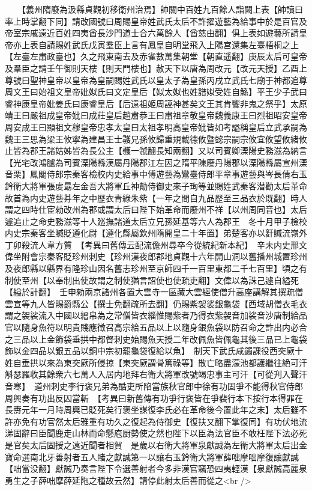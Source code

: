 　　【義州隋廢為汲縣貞觀初移衛州治焉】帥關中百姓九百餘人詣闕上表【帥讀曰率上時掌翻下同】請改國號曰周賜皇帝姓武氏太后不許擢遊藝為給事中於是百官及帝室宗戚遠近百姓四夷酋長沙門道士合六萬餘人【酋慈由翻】俱上表如遊藝所請皇帝亦上表自請賜姓武氏戊寅羣臣上言有鳳皇自明堂飛入上陽宫還集左臺梧桐之上【左臺左肅政臺也】久之飛東南去及赤雀數萬集朝堂【朝直遥翻】庚辰太后可皇帝及羣臣之請壬午御則天樓【則天門樓也】赦天下以唐為周改元【改元天授】乙酉上尊號曰聖神皇帝以皇帝為皇嗣賜姓武氏以皇太子為皇孫丙戌立武氏七廟于神都追尊周文王曰始祖文皇帝妣姒氏曰文定皇后【姒太姒也姓譜姒受姓自鯀】平王少子武曰睿神康皇帝妣姜氏曰康睿皇后【后遠祖姬周誣神甚矣文王其肯饗非鬼之祭乎】太原靖王曰嚴祖成皇帝妣曰成莊皇后趙肅恭王曰肅祖章敬皇帝魏義康王曰烈祖昭安皇帝周安成王曰顯祖文穆皇帝忠孝太皇曰太祖孝明高皇帝妣皆如考謚稱皇后立武承嗣為魏王三思為梁王攸寧為建昌王士彠兄孫攸歸重規載德攸暨懿宗嗣宗攸宜攸望攸緒攸止皆為郡王諸姑姊皆為長公主【彠一虢翻長知兩翻】又以司賓卿溧陽史務滋為納言【光宅改鴻臚為司賓溧陽縣漢屬丹陽郡江左因之隋平陳廢丹陽郡以溧陽縣屬宣州溧音栗】鳳閣侍郎宗秦客檢校内史給事中傅遊藝為鸞臺侍郎平章事遊藝與岑長倩右玉鈐衛大將軍張䖍朂左金吾大將軍丘神勣侍御史來子珣等並賜姓武秦客潜勸太后革命故首為内史遊藝朞年之中歷衣青綠朱紫【一年之間自九品歷至三品衣於既翻】時人謂之四時仕宦勑改州為郡或謂太后曰陛下始革命而廢州不祥【以州周同音也】太后遽追止之命史務滋等十人廵撫諸道太后立兄孫延基等六人為郡王　冬十月甲子檢校内史宗秦客坐贓貶遵化尉【遵化縣屬欽州隋開皇二十年置】弟楚客亦以姧贓流嶺外　丁卯殺流人韋方質　【考異曰舊傳云配流儋州尋卒今從統紀新本紀】　辛未内史邢文偉坐附會宗秦客貶珍州刺史【珍州漢夜郎郡地貞觀十六年開山洞以舊播州城置珍州及夜郎縣以縣界有隆珍山因名舊志珍州至京師四千一百里東都二千七百里】頃之有制使至州【以奉制出使故謂之制使猶言詔使也使疏吏翻】文偉以為誅己遽自縊死【縊於計翻】　壬申勑兩京諸州各置大雲寺一區藏大雲經使僧升高座講解其撰疏僧雲宣等九人皆賜爵縣公【撰士免翻疏所去翻】仍賜紫袈裟銀龜袋【西域胡僧衣毛衣謂之袈裟流入中國以繒帛為之常僧皆衣緇惟賜紫者乃得衣紫袈音加裟音沙唐制給品官以隨身魚符以明貴賤應徵召高宗給五品以上以隨身銀魚袋以防召命之詐出内必合之三品以上金飾袋垂拱中都督刺史始賜魚天授二年改佩魚皆佩龜其後三品已上龜袋飾以金四品以銀五品以銅中宗初罷龜袋復給以魚】　制天下武氏咸蠲課役西突厥十姓自垂拱以來為東突厥所侵掠【東突厥謂骨篤祿等】散亡略盡濛池都護繼往絶可汗斛瑟羅收其餘衆六七萬人入居内地拜右衛大將軍改號竭忠事主可汗【可從刋入聲汗音寒】　道州刺史李行褒兄弟為酷吏所陷當族秋官郎中徐有功固爭不能得秋官侍郎周興奏有功出反囚當斬　【考異曰新舊傳有功爭行褒皆在爭裴行本下按行本得罪在長夀元年一月時周興已貶死矣行褒坐謀復李氏必在革命後今置此年之末】太后雖不許亦免有功官然太后雅重有功久之復起為侍御史【復扶又翻下掌復同】有功伏地流涕固辭曰臣聞鹿走山林而命懸庖厨勢使之然也陛下以臣為法官臣不敢枉陛下法必死是官矣太后固授之遠近聞者相賀　是歲以右衛大將軍泉獻誠為左衛大將軍太后出金寶命選南北牙善射者五人賭之獻誠第一以讓右玉鈐衛大將軍薛咄摩咄摩復讓獻誠【咄當没翻】獻誠乃奏言陛下令選善射者今多非漢官竊恐四夷輕漢【泉獻誠高麗泉勇生之子薛咄摩薛延陁之種故云然】請停此射太后善而從之<br />
